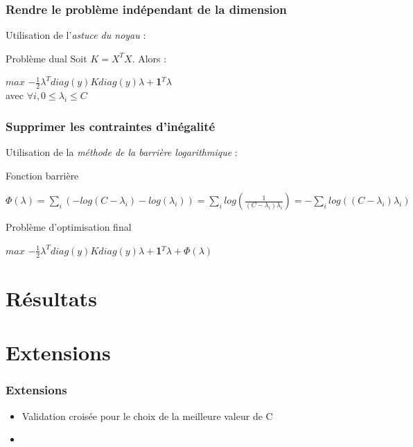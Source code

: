 \documentclass{beamer}
\begin{document}
\begin{frame}
\frametitle{Rendre le problème indépendant de la dimension}

Utilisation de l'\emph{astuce du noyau} :

\begin{block}{Problème dual}
Soit $K = X^TX$. Alors :
                 \begin{center}
                 $max$ $-\frac{1}{2}\lambda^Tdiag(y)Kdiag(y)\lambda+$\textbf{1}$^T\lambda$\\
                 avec $\forall i, 0 \leq \lambda_i \leq C$ 
                 \end{center}
\end{block}

\end{frame}

\begin{frame}
\frametitle{Supprimer les contraintes d'inégalité}

Utilisation de la \emph{méthode de la barrière logarithmique} :

\begin{block}{Fonction barrière}
          \begin{center}
          $\Phi(\lambda) = \sum_i (- log(C - \lambda_i) - log(\lambda_i)) = \sum_i log(\frac{1}{(C - \lambda_i)\lambda_i}) = - \sum_i log((C - \lambda_i)\lambda_i)$ 
          \end{center}
\end{block}

\begin{block}{Problème d'optimisation final}
          \begin{center}
          $max$ $-\frac{1}{2}\lambda^Tdiag(y)Kdiag(y)\lambda+$\textbf{1}$^T\lambda + \Phi(\lambda)$\\ 
          \end{center}
\end{block}

\end{frame}

\section{Résultats}


\section{Extensions}

\begin{frame}
\frametitle{Extensions}

\begin{itemize}
\item Validation croisée pour le choix de la meilleure valeur de C

\item %
\end{itemize}

\end{frame}

\end{document}
